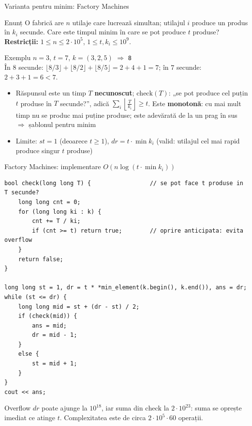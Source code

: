 \documentclass[8pt,mathserif]{beamer}
\begin{document}
\begin{frame}{Varianta pentru minim: Factory Machines }
  \begin{exampleblock}{Enunț}
    O fabrică are $n$ utilaje care lucrează simultan; utilajul $i$ produce un produs în $k_i$ secunde. Care este timpul minim în care se pot produce $t$ produse? \textbf{Restricții:} $1 \le n \le 2 \cdot 10^5$, $1 \le t, k_i \le 10^9$.
  \end{exampleblock}
  \begin{block}{Exemplu}
    $n = 3$, $t = 7$, $k = (3, 2, 5)$ \quad $\Longrightarrow$ \quad \texttt{8}\\
    În $8$ secunde: $\lfloor 8/3 \rfloor + \lfloor 8/2 \rfloor + \lfloor 8/5 \rfloor = 2 + 4 + 1 = 7$; în $7$ secunde: $2 + 3 + 1 = 6 < 7$.
  \end{block}
  \begin{itemize}
    \item Răspunsul este un timp $T$ \textbf{necunoscut}; $\mathrm{check}(T)$: „se pot produce cel puțin $t$ produse în $T$ secunde?”, adică $\displaystyle\sum_{i} \left\lfloor \frac{T}{k_i} \right\rfloor \ge t$. Este \textbf{monotonă}: cu mai mult timp nu se produc mai puține produse; este adevărată de la un prag în sus $\Rightarrow$ șablonul pentru minim
    \item Limite: $st = 1$ (deoarece $t \ge 1$), $dr = t \cdot \min k_i$ (valid: utilajul cel mai rapid produce singur $t$ produse)
  \end{itemize}
\end{frame}

\begin{frame}[fragile]{Factory Machines: implementare \textemdash{} $O(n \log (t \cdot \min k_i))$}
  \begin{lstlisting}
bool check(long long T) {                 // se pot face t produse in T secunde?
    long long cnt = 0;
    for (long long ki : k) {
        cnt += T / ki;
        if (cnt >= t) return true;        // oprire anticipata: evita overflow
    }
    return false;
}

long long st = 1, dr = t * *min_element(k.begin(), k.end()), ans = dr;
while (st <= dr) {
    long long mid = st + (dr - st) / 2;
    if (check(mid)) {
        ans = mid;
        dr = mid - 1;
    }
    else {
        st = mid + 1;
    }
}
cout << ans;
  \end{lstlisting}
  \begin{alertblock}{Overflow}
    $dr$ poate ajunge la $10^{18}$, iar suma din $\mathrm{check}$ la $2 \cdot 10^{23}$: suma se oprește imediat ce atinge $t$. Complexitatea este de circa $2 \cdot 10^5 \cdot 60$ operații.
  \end{alertblock}
\end{frame}
\end{document}

